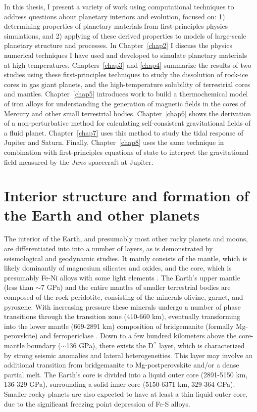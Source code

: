 In this thesis, I present a variety of work using computational techniques to
address questions about planetary interiors and evolution, focused on: 1)
determining properties of planetary materials from first-principles physics
simulations, and 2) applying of these derived properties to models of
large-scale planetary structure and processes. In Chapter~\ref{chap2} I discuss
the physics numerical techniques I have used and developed to simulate
planetary materials at high temperatures. Chapters~\ref{chap3} and \ref{chap4}
summarize the results of two studies using these first-principles techniques to
study the dissolution of rock-ice cores in gas giant planets, and the
high-temperature solubility of terrestrial cores and mantles.
Chapter~\ref{chap5} introduces work to build a thermochemical model of iron 
alloys for understanding the generation of magnetic fields in the cores of
Mercury and other small terrestrial bodies. Chapter~\ref{chap6} shows the 
derivation of a non-perturbative method for calculating self-consistent 
gravitational fields of a fluid planet. Chapter~\ref{chap7} uses this method 
to study the tidal response of Jupiter and Saturn. Finally, Chapter~\ref{chap8}
uses the same technique in combination with first-principles equations of state
to interpret the gravitational field measured by the \textit{Juno} spacecraft 
at Jupiter.

\section{Interior structure and formation of the Earth and other planets}

The interior of the Earth, and presumably most other rocky planets and moons,
are differentiated into into a number of layers, as is demonstrated by
seismological and geodynamic studies. It mainly consists of the mantle, which
is likely dominantly of magnesium silicates and oxides, and the core, which is
presumably Fe-Ni alloys with some light elements
\cite{Birch1952,Mcdonough1995}.  The Earth's upper mantle (less than $\sim$7
GPa) and the entire mantles of smaller terrestrial bodies are composed of the
rock peridotite, consisting of the minerals olivine, garnet, and pyroxene. With
increasing pressure these minerals undergo a number of phase transitions
through the transition zone (410-660 km), eventually transforming into the
lower mantle (669-2891 km) composition of bridgemanite (formally Mg-perovskite)
and ferropericlase \cite{Tronnes2010}.  Down to a few hundred kilometers above
the core-mantle boundary ($\sim$136 GPa), there exists the D$^{\prime\prime}$
layer, which is characterized by strong seismic anomalies and lateral
heterogeneities. This layer may involve an additional transition from
bridgemanite to Mg-postperovskite and/or a dense partial melt.  The Earth's
core is divided into a liquid outer core (2891-5150 km, 136-329 GPa),
surrounding a solid inner core (5150-6371 km, 329-364 GPa). Smaller rocky
planets are also expected to have at least a thin liquid outer core, due to the
significant freezing point depression of Fe-S alloys.


